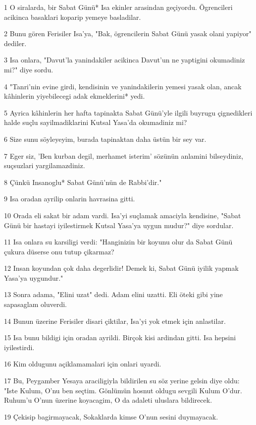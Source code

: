 \par 1 O siralarda, bir Sabat Günü* Isa ekinler arasindan geçiyordu. Ögrencileri acikinca basaklari koparip yemeye basladilar.
\par 2 Bunu gören Ferisiler Isa'ya, "Bak, ögrencilerin Sabat Günü yasak olani yapiyor" dediler.
\par 3 Isa onlara, "Davut'la yanindakiler acikinca Davut'un ne yaptigini okumadiniz mi?" diye sordu.
\par 4 "Tanri'nin evine girdi, kendisinin ve yanindakilerin yemesi yasak olan, ancak kâhinlerin yiyebilecegi adak ekmeklerini* yedi.
\par 5 Ayrica kâhinlerin her hafta tapinakta Sabat Günü'yle ilgili buyrugu çignedikleri halde suçlu sayilmadiklarini Kutsal Yasa'da okumadiniz mi?
\par 6 Size sunu söyleyeyim, burada tapinaktan daha üstün bir sey var.
\par 7 Eger siz, 'Ben kurban degil, merhamet isterim' sözünün anlamini bilseydiniz, suçsuzlari yargilamazdiniz.
\par 8 Çünkü Insanoglu* Sabat Günü'nün de Rabbi'dir."
\par 9 Isa oradan ayrilip onlarin havrasina gitti.
\par 10 Orada eli sakat bir adam vardi. Isa'yi suçlamak amaciyla kendisine, "Sabat Günü bir hastayi iyilestirmek Kutsal Yasa'ya uygun mudur?" diye sordular.
\par 11 Isa onlara su karsiligi verdi: "Hanginizin bir koyunu olur da Sabat Günü çukura düserse onu tutup çikarmaz?
\par 12 Insan koyundan çok daha degerlidir! Demek ki, Sabat Günü iyilik yapmak Yasa'ya uygundur."
\par 13 Sonra adama, "Elini uzat" dedi. Adam elini uzatti. Eli öteki gibi yine sapasaglam oluverdi.
\par 14 Bunun üzerine Ferisiler disari çiktilar, Isa'yi yok etmek için anlastilar.
\par 15 Isa bunu bildigi için oradan ayrildi. Birçok kisi ardindan gitti. Isa hepsini iyilestirdi.
\par 16 Kim oldugunu açiklamamalari için onlari uyardi.
\par 17 Bu, Peygamber Yesaya araciligiyla bildirilen su söz yerine gelsin diye oldu: "Iste Kulum, O'nu ben seçtim. Gönlümün hosnut oldugu sevgili Kulum O'dur. Ruhum'u O'nun üzerine koyacagim, O da adaleti uluslara bildirecek.
\par 19 Çekisip bagirmayacak, Sokaklarda kimse O'nun sesini duymayacak.
